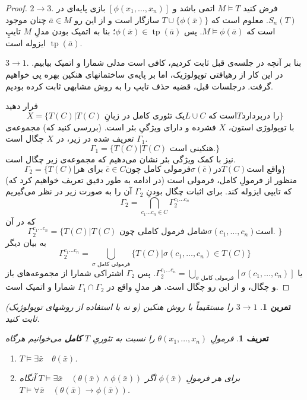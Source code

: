 \documentclass[12pt,a4paper]{report}
\theoremstyle{colorhead}
\newtheorem{tam}[thm]{تمرین}
\newtheorem{defn}[thm]{تعریف}
\DeclareMathOperator{\tp}{tp}
\begin{document}
\begin{proof}
$2\to 3$.
فرض کنید
$M\models T$
اتمی باشد و 
$[\phi(x_1,\ldots,x_n)]$
بازی پایه‌ای در
$S_n(T)$.
معلوم است که 
$T\cup \{\phi(\bar{x})\}$
سازگار است و  از این رو
$\bar{a}\in M$
چنان موجود است که
$M\models \phi(\bar{a})$.
پس
$\phi(\bar{x})\in \tp(\bar{a})$؛
بنا به اتمیک بودن مدلِ
$M$
تایپِ
$\tp(\bar{a})$
ایزوله است. 
\par 
$3\to 1$.
بنا بر آنچه در جلسه‌ی قبل ثابت کردیم، کافی است مدلی شمارا و اتمیک بیابیم. در این کار از رهیافتی توپولوژیک، اما بر پایه‌ی ساختمانهای هنکین بهره  پی خواهیم گرفت.    درجلسات قبل، قضیه حذف تایپ را به روش مشابهی ثابت کرده بودیم.
\par 
قرار دهید
\[
X=\{T(C)|\text{$T(C)$ یک تئوری کامل در  زبانِ
$L\cup C$ است که
$T$
را دربردارد}
\}
\]
با  توپولوژی استون،
$X$
فشرده و دارای ویژگیِ
بئر است. (بررسی کنید که)
مجموعه‌ی
$\Gamma_1$
تعریف شده در زیر، در
$X$
چگال است. 
\[
\Gamma_1=\{T(C)| \text{$T(C)$ هنکینی است.}\}
\]
نیز با کمک ویژگی بئر نشان می‌دهیم که مجموعه‌ی زیر چگال است.
\[
\Gamma_2=\{T(C)|\text{برای هر 
$\bar{c}\in C$
فرمولی کامل چون
$\sigma(\bar{c})$
در
$T(C)$
واقع است
}\}
\]
(در ادامه به طور دقیق تعریف خواهیم کرد که) منظور از فرمولِ کامل، فرمولی است که 
تایپی ایزوله کند. برای اثبات چگال بودنِ
$\Gamma_2$
آن را به صورت زیر در نظر می‌گیریم
\[
\Gamma_2=\bigcap_{c_1\ldots c_n\in C }\Gamma_2^{c_1\ldots c_n}
\]
 که در آن
 \[
 \Gamma_2^{c_1\ldots c_n}=\{T(C)| \text{$T(C)$ شامل فرمول کاملی چون
$\sigma(c_1,\ldots,c_n)$
است. 
 }
\} 
 \]
به بیان دیگر
\[
 \Gamma_2^{c_1\ldots c_n}=\bigcup_{\text{$\sigma$ فرمولی کامل}} \{T(C)|\sigma(c_1,\ldots,c_n)\in T(C)\}
\]
یا
$\Gamma_2^{c_1\ldots c_n}=\bigcup_{\text{$\sigma$ فرمولی کامل}} [\sigma(c_1,\ldots,c_n)]$.
پس
$\Gamma_2$
اشتراکی شمارا از مجموعه‌های باز و چگال، و از این رو چگال است. هر مدلِ واقع در
$\Gamma_1\cap \Gamma_2$
شمارا و اتمیک است. 
\end{proof}
\begin{tam}
$3\to 1$
را مستقیماً با روش هنکین (و نه با استفاده از روشهای توپولوژیک) ثابت کنید.
\end{tam}
\begin{defn}
فرمولِ
$\theta(x_1,\ldots,x_n)$
را نسبت به تئوریِ
$T$
\textbf{کامل}
 می‌خوانیم هرگاه 
\begin{enumerate}
\item 
$T\models \exists\bar{x}\quad \theta(\bar{x})$.
\item
برای هر فرمولِ
$\phi(\bar{x})$
اگر
$T\models \exists \bar{x}\quad (\theta(\bar{x})\wedge \phi(\bar{x}))$
آنگاه 
$T\models \forall\bar{x}\quad (\theta(\bar{x})\to \phi(\bar{x}))$.
\end{enumerate}
\end{defn}
\end{document}
